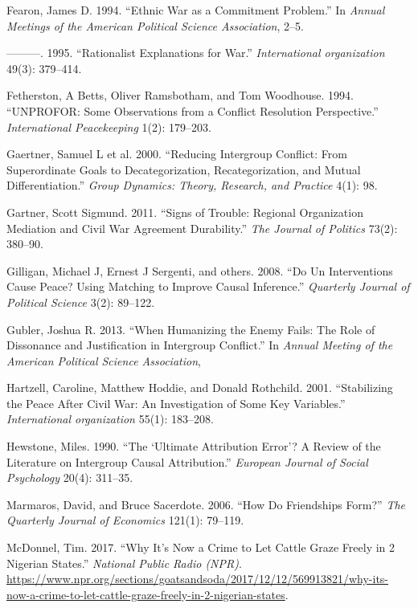 \documentclass[11pt]{article}
\begin{document}
\hypertarget{ref-fearon1994ethnic}{}
Fearon, James D. 1994. ``Ethnic War as a Commitment Problem.'' In
\emph{Annual Meetings of the American Political Science Association},
2--5.

\hypertarget{ref-fearon1995rationalist}{}
---------. 1995. ``Rationalist Explanations for War.''
\emph{International organization} 49(3): 379--414.

\hypertarget{ref-fetherston1994unprofor}{}
Fetherston, A Betts, Oliver Ramsbotham, and Tom Woodhouse. 1994.
``UNPROFOR: Some Observations from a Conflict Resolution Perspective.''
\emph{International Peacekeeping} 1(2): 179--203.

\hypertarget{ref-gaertner2000reducing}{}
Gaertner, Samuel L et al. 2000. ``Reducing Intergroup Conflict: From
Superordinate Goals to Decategorization, Recategorization, and Mutual
Differentiation.'' \emph{Group Dynamics: Theory, Research, and Practice}
4(1): 98.

\hypertarget{ref-gartner2011signs}{}
Gartner, Scott Sigmund. 2011. ``Signs of Trouble: Regional Organization
Mediation and Civil War Agreement Durability.'' \emph{The Journal of
Politics} 73(2): 380--90.

\hypertarget{ref-gilligan2008interventions}{}
Gilligan, Michael J, Ernest J Sergenti, and others. 2008. ``Do Un
Interventions Cause Peace? Using Matching to Improve Causal Inference.''
\emph{Quarterly Journal of Political Science} 3(2): 89--122.

\hypertarget{ref-gubler2013humanizing}{}
Gubler, Joshua R. 2013. ``When Humanizing the Enemy Fails: The Role of
Dissonance and Justification in Intergroup Conflict.'' In \emph{Annual
Meeting of the American Political Science Association},

\hypertarget{ref-hartzell2001stabilizing}{}
Hartzell, Caroline, Matthew Hoddie, and Donald Rothchild. 2001.
``Stabilizing the Peace After Civil War: An Investigation of Some Key
Variables.'' \emph{International organization} 55(1): 183--208.

\hypertarget{ref-hewstone1990ultimate}{}
Hewstone, Miles. 1990. ``The `Ultimate Attribution Error'? A Review of
the Literature on Intergroup Causal Attribution.'' \emph{European
Journal of Social Psychology} 20(4): 311--35.

\hypertarget{ref-marmaros2006friendships}{}
Marmaros, David, and Bruce Sacerdote. 2006. ``How Do Friendships Form?''
\emph{The Quarterly Journal of Economics} 121(1): 79--119.

\hypertarget{ref-mcdonnel2017graze}{}
McDonnel, Tim. 2017. ``Why It's Now a Crime to Let Cattle Graze Freely
in 2 Nigerian States.'' \emph{National Public Radio (NPR)}.
\url{https://www.npr.org/sections/goatsandsoda/2017/12/12/569913821/why-its-now-a-crime-to-let-cattle-graze-freely-in-2-nigerian-states}.
\end{document}
